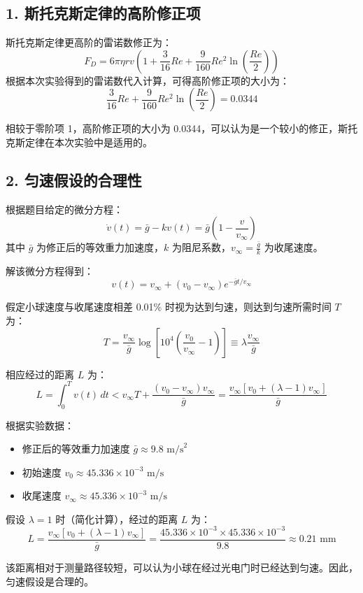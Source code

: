 \documentclass[UTF8]{ctexart}
\begin{document}
\subsection{1. 斯托克斯定律的高阶修正项}

斯托克斯定律更高阶的雷诺数修正为：
\[
F_D = 6 \pi \eta r v \left(1 + \frac{3}{16}Re + \frac{9}{160}Re^2 \ln\left(\frac{Re}{2}\right)\right)
\]
根据本次实验得到的雷诺数代入计算，可得高阶修正项的大小为：
\[
\frac{3}{16}Re + \frac{9}{160}Re^2 \ln\left(\frac{Re}{2}\right) = 0.0344
\]

相较于零阶项 1，高阶修正项的大小为 0.0344，可以认为是一个较小的修正，斯托克斯定律在本次实验中是适用的。

\subsection{2. 匀速假设的合理性}

根据题目给定的微分方程：
\[
\dot{v}(t) = \bar{g} - kv(t) = \bar{g} \left(1 - \frac{v}{v_\infty}\right)
\]
其中 \( \bar{g} \) 为修正后的等效重力加速度，\( k \) 为阻尼系数，\( v_\infty = \frac{\bar{g}}{k} \) 为收尾速度。

解该微分方程得到：
\[
v(t) = v_\infty + (v_0 - v_\infty) e^{-\bar{g}t/v_\infty}
\]

假定小球速度与收尾速度相差 0.01\% 时视为达到匀速，则达到匀速所需时间 \( T \) 为：
\[
T = \frac{v_\infty}{\bar{g}} \log\left[10^4 \left(\frac{v_0}{v_\infty} - 1\right)\right] \equiv \lambda \frac{v_\infty}{\bar{g}}
\]

相应经过的距离 \( L \) 为：
\[
L = \int_0^T v(t) \, dt < v_\infty T + \frac{(v_0 - v_\infty) v_\infty}{\bar{g}} = \frac{v_\infty [v_0 + (\lambda - 1) v_\infty]}{\bar{g}}
\]

根据实验数据：
\begin{itemize}
    \item 修正后的等效重力加速度 \( \bar{g} \approx 9.8 \text{ m/s}^2 \)
    \item 初始速度 \( v_0 \approx 45.336 \times 10^{-3} \text{ m/s} \)
    \item 收尾速度 \( v_\infty \approx 45.336 \times 10^{-3} \text{ m/s} \)
\end{itemize}

假设 \( \lambda = 1 \) 时（简化计算），经过的距离 \( L \) 为：
\[
L = \frac{v_\infty [v_0 + (\lambda - 1) v_\infty]}{\bar{g}} = \frac{45.336 \times 10^{-3} \times 45.336 \times 10^{-3}}{9.8} \approx 0.21 \text{ mm}
\]

该距离相对于测量路径较短，可以认为小球在经过光电门时已经达到匀速。因此，匀速假设是合理的。
\end{document}
